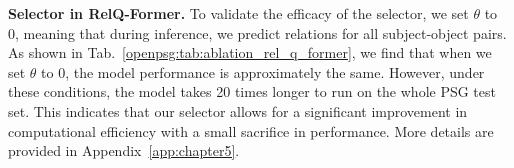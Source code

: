 \begin{table}[t]\small
    \centering
    \setlength{\tabcolsep}{2.8mm}
    \caption{Ablation study of comparison of different designs in RelQ-Former.}
    \label{openpsg:tab:ablation_rel_q_former}
\end{table}


\noindent \textbf{Selector in RelQ-Former.}
To validate the efficacy of the selector, we set $\theta$ to 0, meaning that during inference, we predict relations for all subject-object pairs.
As shown in Tab.~\ref{openpsg:tab:ablation_rel_q_former}, we find that when we set $\theta$ to 0, the model performance is approximately the same.
However, under these conditions, the model takes 20 times longer to run on the whole PSG test set.
This indicates that our selector allows for a significant improvement in computational efficiency with a small sacrifice in performance.
More details are provided in Appendix~\ref{app:chapter5}.


